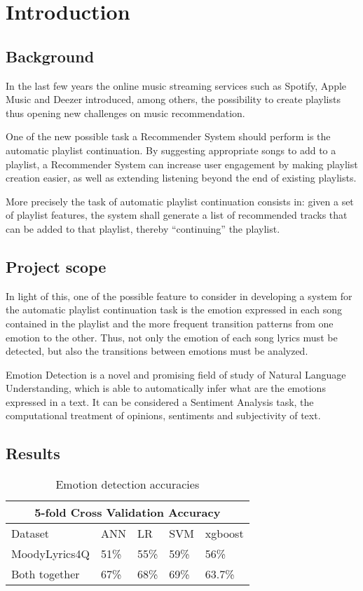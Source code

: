 \chapter{Introduction}
\section{Background}
In the last few years the online music streaming services such as Spotify, Apple Music and Deezer introduced, among others,  the possibility to create playlists thus opening new challenges on music recommendation.\par
One of the new possible task a Recommender System should perform is the automatic playlist continuation. By suggesting appropriate songs to add to a playlist, a Recommender System can increase user engagement by making playlist creation easier, as well as extending listening beyond the end of existing playlists. \par
More precisely the task of automatic playlist continuation consists in: given a set of playlist features, the system shall generate a list of recommended tracks that can be added to that playlist, thereby ``continuing'' the playlist. \par

\section{Project scope}
In light of this, one of the possible feature to consider in developing a system for the automatic playlist continuation task is the emotion expressed in each song contained in the playlist and the more frequent transition patterns from one emotion to the other. Thus, not only the emotion of each song lyrics must be detected, but also the transitions between emotions must be analyzed. \par
Emotion Detection is a novel and promising field of study of Natural Language Understanding, which is able to automatically infer what are the emotions expressed in a text. It can be considered a Sentiment Analysis task, the computational treatment of opinions, sentiments and subjectivity of text. \par

\section{Results}
\begin{table}[H]
\centering
\begin{tabular}{ |p{3cm}||p{1.5cm}|p{1.5cm}|p{1.5cm}|p{1.5cm}|  }
 \hline
 \multicolumn{5}{|c|}{5-fold Cross Validation Accuracy} \\
 \hline
 Dataset & ANN & LR &SVM & xgboost\\
 \hline
MoodyLyrics4Q  & 51\%    &55\% &  59\% & 56\%\\
Both together &   67\%  & 68\%   &69\% &63.7\%\\
\hline
\end{tabular}
\caption{Emotion detection accuracies} \label{tab:compar}
\end{table}


